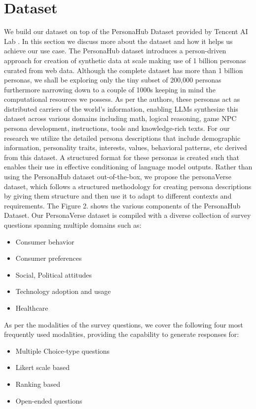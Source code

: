 \documentclass[11pt]{article}
\begin{document}
\section{Dataset}

We build our dataset on top of the PersonaHub Dataset provided by Tencent AI Lab \citep{ge2024scalingsyntheticdatacreation}. In this section we discuss more about the dataset and how it helps us achieve our use case. The PersonaHub dataset introduces a person-driven approach for creation of synthetic data at scale making use of 1 billion personas curated from web data. Although the complete dataset has more than 1 billion personas, we shall be exploring only the tiny subset of 200,000 personas furthermore narrowing down to a couple of 1000s keeping in mind the computational resources we possess. As per the authors, these personas act as distributed carriers of the world's information, enabling LLMs synthesize this dataset across various domains including math, logical reasoning, game NPC persona development, instructions, tools and knowledge-rich texts.
For our research we utilize the detailed persona descriptions that include demographic information, personality traits, interests, values, behavioral patterns, etc derived from this dataset. A structured format for these personas is created such that enables their use in effective conditioning of language model outputs. Rather than using the PersonaHub dataset out-of-the-box, we propose the personaVerse dataset, which follows a structured methodology for creating persona descriptions by giving them structure and then use it to adapt to different contexts and requirements.
The Figure 2. shows the various components of the PersonaHub Dataset.
Our PersonaVerse dataset is compiled with a diverse collection of survey questions spanning multiple domains such as:
\begin{itemize}
    \item Consumer behavior
    \item Consumer preferences
    \item Social, Political attitudes
    \item Technology adoption and usage
    \item Healthcare
\end{itemize}
As per the modalities of the survey questions, we cover the following four most frequently used modalities, providing the capability to generate responses for:
\begin{itemize}
    \item Multiple Choice-type questions
    \item Likert scale based
    \item Ranking based
    \item Open-ended questions
\end{itemize}
\end{document}
